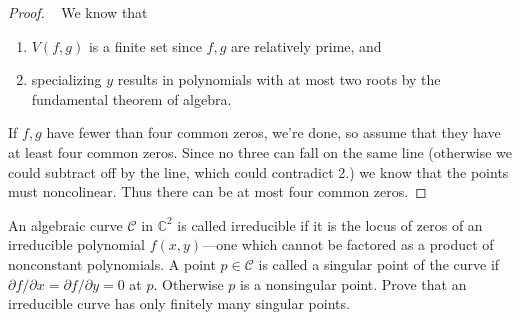 \documentclass{article}
\newenvironment{problem}[2][Problem]{\begin{trivlist}
\item[\hskip \labelsep {\bfseries #1}\hskip \labelsep {\bfseries #2.}]}{\end{trivlist}}
\begin{document}
\begin{proof} ~
  We know that \begin{enumerate}
    \item $V(f, g)$ is a finite set since $f, g$ are relatively prime, and
    \item specializing $y$ results in polynomials with at most two roots by the
    fundamental theorem of algebra.
  \end{enumerate}
  If $f, g$ have fewer than four common zeros, we're done, so assume that they
  have at least four common zeros. Since no three can fall on the same line
  (otherwise we could subtract off by the line, which could contradict 2.) we
  know that the points must noncolinear. Thus there can be at most four common
  zeros.
\end{proof}
\pagebreak
\begin{problem}{10 (Artin)}
  An algebraic curve $\mathcal C$ in $\mathbb C^2$ is called irreducible if it
  is the locus of zeros of an irreducible polynomial $f(x, y)$---one which
  cannot be factored as a product of nonconstant polynomials. A point
  $p \in \mathcal C$ is called a singular point of the curve if
  $\partial f/\partial x = \partial f/\partial y = 0$ at $p$. Otherwise $p$ is
  a nonsingular point. Prove that an irreducible curve has only finitely many
  singular points.
\end{problem}
\end{document}
